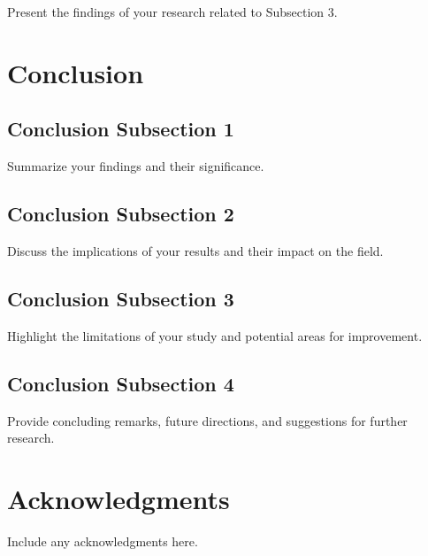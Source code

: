 \documentclass[12pt]{article}
\begin{document}
Present the findings of your research related to Subsection 3.

\section{Conclusion}
\label{sec:conclusion}

\subsection{Conclusion Subsection 1}
\label{subsec:conclusion1}

Summarize your findings and their significance.

\subsection{Conclusion Subsection 2}
\label{subsec:conclusion2}

Discuss the implications of your results and their impact on the field.

\subsection{Conclusion Subsection 3}
\label{subsec:conclusion3}

Highlight the limitations of your study and potential areas for improvement.

\subsection{Conclusion Subsection 4}
\label{subsec:conclusion4}

Provide concluding remarks, future directions, and suggestions for further research.

\section*{Acknowledgments}

Include any acknowledgments here.



\end{document}
